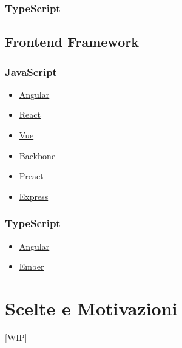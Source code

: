 \documentclass[a4paper, 12pt]{article}
\begin{document}
\subsubsection{TypeScript}

\subsection{Frontend Framework}
\subsubsection{JavaScript}
\begin{itemize}
    \item \href{https://angularjs.org/}{Angular}
    \item \href{https://react.dev/}{React}
    \item \href{https://vuejs.org/}{Vue}
    \item \href{https://backbonejs.org/}{Backbone}
    \item \href{https://preactjs.com/}{Preact}
    \item \href{https://expressjs.com/}{Express}
\end{itemize}
\subsubsection{TypeScript}
\begin{itemize}
    \item \href{https://angularjs.org/}{Angular}
    \item \href{https://emberjs.com/}{Ember}
\end{itemize}

\newpage
\section{Scelte e Motivazioni}
[WIP]
\end{document}
